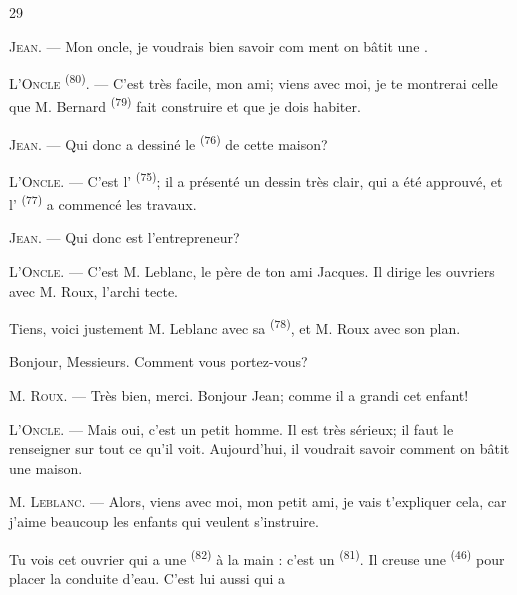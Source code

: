 \begin{VUpage}[31]{29}
\VUsaut{6.0mm}
\VUsaut{1.4mm}
\VUsaut{2.2mm}

\VUblancAlinea
\textsc{Jean}. --- Mon oncle, je voudrais bien savoir com\cc
ment on bâtit une .

\VUblancAlinea
\textsc{L'Oncle} \textsuperscript{(80)}. --- C'est très facile, mon ami; viens\nl
avec moi, je te montrerai celle que M. Bernard \textsuperscript{(79)}\nl
fait construire et que je dois habiter.

\VUblancAlinea
\textsc{Jean}. --- Qui donc a dessiné le  \textsuperscript{(76)} de cette\nl
maison?

\VUblancAlinea
\textsc{L'Oncle}. --- C'est l' \textsuperscript{(75)}; il a présenté\nl
un dessin très clair, qui a été approuvé, et l'\cc
{} \textsuperscript{(77)} a commencé les travaux.

\VUblancAlinea
\textsc{Jean}. --- Qui donc est l'entrepreneur?

\VUblancAlinea
\textsc{L'Oncle}. --- C'est M. Leblanc, le père de ton ami\nl
Jacques. Il dirige les ouvriers avec M. Roux, l'archi\cc
tecte.

\VUblancAlinea
Tiens, voici justement M. Leblanc avec sa  \textsuperscript{(78)},\nl
et M. Roux avec son plan.

\VUblancAlinea
Bonjour, Messieurs. Comment vous portez-vous?

\VUblancAlinea
\textsc{M. Roux}. --- Très bien, merci. Bonjour Jean;\nl
comme il a grandi cet enfant!

\VUblancAlinea
\textsc{L'Oncle}. --- Mais oui, c'est un petit homme. Il est\nl
très sérieux; il faut le renseigner sur tout ce qu'il\nl
voit. Aujourd'hui, il voudrait savoir comment on\nl
bâtit une maison.

\VUblancAlinea
\textsc{M. Leblanc}. --- Alors, viens avec moi, mon petit\nl
ami, je vais t'expliquer cela, car j'aime beaucoup les\nl
enfants qui veulent s'instruire.

\VUblancAlinea
Tu vois cet ouvrier qui a une  \textsuperscript{(82)} à la main :\nl
c'est un  \textsuperscript{(81)}. Il creuse une  \textsuperscript{(46)}\nl
pour placer la conduite d'eau. C'est lui aussi qui a
\parplein
\end{VUpage}

